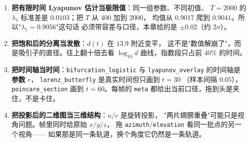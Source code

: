 \begin{enumerate}
        等于假装序列已经到极限。
  \item \textbf{把有限时间 Lyapunov 估计当极限值}：同一组参数、不同初值、
        $T=2000$ 的 $\lambda_1$ 标准差是 $0.0103$；把 $T$ 从 $400$ 加到 $2000$，
        均值从 $0.9017$ 爬到 $0.9041$。所以"$\lambda_1=0.9056$"这句话
        必须带容差与口径，本章给的是 $\pm0.02$（约 $2\sigma$）。
  \item \textbf{把饱和后的分离当发散}：$d(t)$ 在 $13.9$ 附近变平，
        这不是"数值解崩了"，而是吸引子的直径。往上翻十倍去看
        $\log_{10}d$ 曲线，指数段只占前 $40\%$ 的时间。
  \item \textbf{把时间轴当时间}：\texttt{bifurcation\_}\allowbreak\texttt{logistic}
        与 \texttt{lyapunov\_}\allowbreak\texttt{overlay} 的时间轴是\textbf{参数} $r$，
        \texttt{lorenz\_}\allowbreak\texttt{butterfly} 是真实时间但只画到 $t=30$
        （样本间隔 $0.05$），\texttt{poincare\_}\allowbreak\texttt{section}
        画到 $t=60$。每帧的 \texttt{meta} 都给出当前口径，拖到头是夹住，不是卡住。
  \item \textbf{把投影后的二维图当三维结构}：$u/v$ 是旋转投影，
        "两片翅膀重叠"可能只是视角问题。帧里同时给原始 $x/y/z$，
        拖 \texttt{azimuth}/\texttt{elevation} 看同一批点的另一个视角——
        如果那是同一条轨道，换个角度它仍然是一条轨道。
\end{enumerate}
